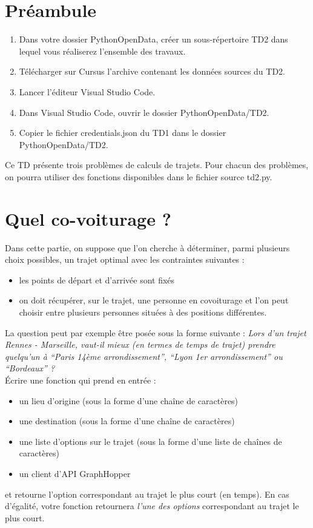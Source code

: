 \documentclass[11pt,a4paper]{article}
\begin{document}
\section*{Préambule}
\begin{enumerate}
    \item Dans votre dossier PythonOpenData, créer un sous-répertoire TD2 dans lequel vous réaliserez l'ensemble des travaux. 
    \item Télécharger sur Cursus l'archive contenant les données sources du TD2.
    \item Lancer l'éditeur Visual Studio Code.
    \item Dans Visual Studio Code, ouvrir le dossier PythonOpenData/TD2. 
    \item Copier le fichier credentials.json du TD1 dans le dossier PythonOpenData/TD2.
\end{enumerate}

Ce TD présente trois problèmes de calculs de trajets. Pour chacun des problèmes, on pourra utiliser des fonctions disponibles dans le fichier source td2.py.

\section{Quel co-voiturage ?}

Dans cette partie, on suppose que l’on cherche à déterminer, parmi plusieurs choix possibles, un trajet optimal avec les contraintes suivantes :
\begin{itemize}
    \item les points de départ et d’arrivée sont fixés
    \item on doit récupérer, sur le trajet, une personne en covoiturage et l’on peut choisir entre plusieurs personnes situées à des positions différentes.
\end{itemize}

La question peut par exemple être posée sous la forme suivante : \emph{
    Lors d’un trajet Rennes - Marseille, vaut-il mieux (en termes de temps de trajet) prendre quelqu’un à “Paris 14ème arrondissement”, “Lyon 1er arrondissement” ou “Bordeaux” ? }
\\

    Écrire une fonction qui prend en entrée :
    \begin{itemize}
        \item un lieu d’origine (sous la forme d’une chaîne de caractères)
        \item une destination (sous la forme d’une chaîne de caractères)
        \item une liste d’options sur le trajet (sous la forme d’une liste de chaînes de caractères)
        \item un client d’API GraphHopper
    \end{itemize}
    et retourne l’option correspondant au trajet le plus court (en temps). En cas d’égalité, votre fonction retournera \emph{l’une des options} correspondant au trajet le plus court.
\end{document}
